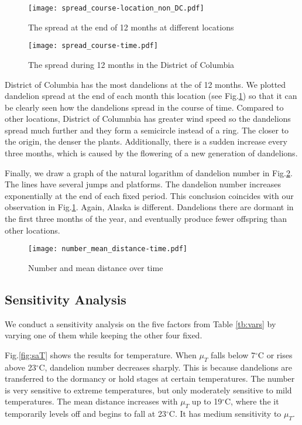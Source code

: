 \documentclass[12pt]{article}
\begin{document}
			\begin{figure}[htbp]
				\centering
				\texttt{[image: spread\_course-location\_non\_DC.pdf]}
				\caption{The spread at the end of 12 months at different locations}
				\label{fig:scatter5loc}
				
				\vspace{1cm}

				\texttt{[image: spread\_course-time.pdf]}
				\caption{The spread during 12 months in the District of Columbia}
				\label{fig:spreadDC}
			\end{figure}
			\newpage
			
			District of Columbia has the most dandelions at the of 12 months.  We plotted dandelion spread at the end of each month this location (see Fig.\ref{fig:spreadDC}) so that it can be clearly seen how the dandelions spread in the course of time.  Compared to other locations, District of Columnbia has greater wind speed so the dandelions spread much further and they form a semicircle instead of a ring.  The closer to the origin, the denser the plants.  Additionally, there is a sudden increase every three months, which is caused by the flowering of a new generation of dandelions.
			
			Finally, we draw a graph of the natural logarithm of dandelion number in Fig.\ref{fig:time}.  The lines have several jumps and platforms.  The dandelion number increases exponentially at the end of each fixed period.  This conclusion coincides with our observation in Fig.\ref{fig:spreadDC}.  Again, Alaska is different.  Dandelions there are dormant in the first three months of the year, and eventually produce fewer offspring than other locations.
			
			\begin{figure}[htbp]
				\centering
				\texttt{[image: number\_mean\_distance-time.pdf]}
				\caption{Number and mean distance over time}
				\label{fig:time}
			\end{figure}
		
		
		
		\subsection{Sensitivity Analysis}
			
			We conduct a sensitivity analysis on the five factors from Table \ref{tb:vars} by varying one of them while keeping the other four fixed.  
			
			Fig.\ref{fig:saT} shows the results for temperature.  When $\mu_T$ falls below 7$^\circ$C or rises above 23$^\circ$C, dandelion number decreases sharply.  This is because dandelions are transferred to the dormancy or hold stages at certain temperatures.  The number is very sensitive to extreme temperatures, but only moderately sensitive to mild temperatures.  The mean distance increases with $\mu_T$ up to 19$^\circ$C, where the it temporarily levels off and begins to fall at 23$^\circ$C.  It has medium sensitivity to $\mu_T$.
			
\end{document}
